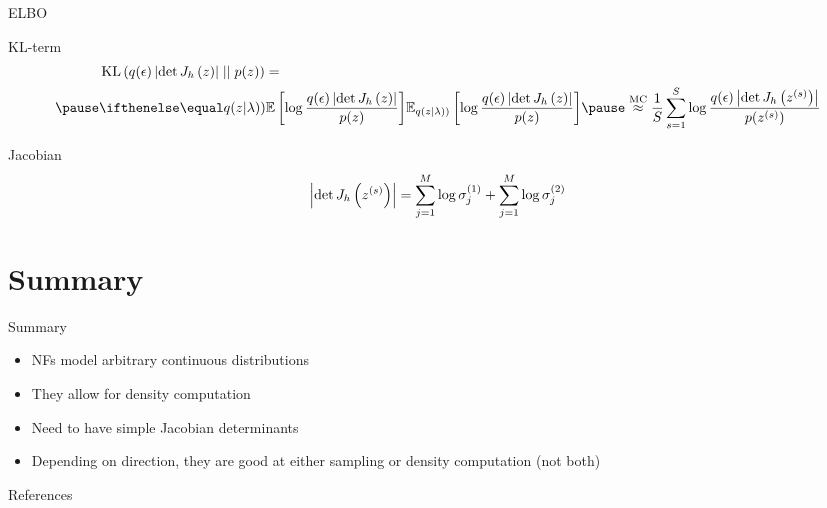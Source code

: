 \documentclass[14pt]{beamer}
\begin{document}
\begin{frame}{ELBO}
\begin{small}
\begin{block}{KL-term}
\begin{equation*}
\begin{aligned}
&\KL{q(\epsilon)\djac{h}{z}}{p(z)} = \\ \pause
&\E[q(z|\lambda))]{\log\frac{q(\epsilon)\djac{h}{z}}{p(z)}} \pause \overset{\text{MC}}{\approx} \frac{1}{S}\sum_{s=1}^{S} \log\frac{q(\epsilon)\djac{h}{z^{(s)}}}{p(z^{(s)})}
\end{aligned}
\end{equation*}
\end{block}
\pause
\begin{block}{Jacobian}
\pause
\begin{equation*}
\left|\det J_{h}\left(z^{(s)}\right)\right| = \sum_{j=1}^{M}\log\sigma^{(1)}_{j} + \sum_{j=1}^{M}\log\sigma^{(2)}_{j}
\end{equation*}
\end{block}
\end{small}
\end{frame}


\section{Summary}

\begin{frame}{Summary}
\begin{itemize}
\item NFs model arbitrary continuous distributions
\item They allow for density computation
\item Need to have simple Jacobian determinants
\item Depending on direction, they are good at either sampling or density computation (not both)
\end{itemize}
\end{frame}

\begin{frame}[allowframebreaks]{References}


\nocite{KingmaEtAl:2016, RezendeMohamed:2015, HuangEtAl:2018}
\end{frame}
\end{document}
